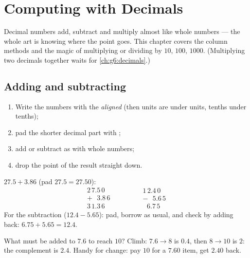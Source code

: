 \chapter{Computing with Decimals}\label{ch:g5:decimalops}

Decimal numbers add, subtract and multiply almost like whole numbers
--- the whole art is knowing where the point goes. This chapter
covers the column methods and the magic of multiplying or dividing by
$10$, $100$, $1000$. (Multiplying two decimals together waits for
\cref{ch:g6:decimals}.)

\section{Adding and subtracting}

\begin{method}\label{met:g5:decimalops:addsub}
\begin{enumerate}
  \item Write the numbers with the \emph{ aligned}
        (then units are under units, tenths under tenths);
  \item pad the shorter decimal part with ;
  \item add or subtract as with whole numbers;
  \item drop the point of the result straight down.
\end{enumerate}
\end{method}

\begin{example}\label{ex:g5:decimalops:addsub}
$27.5 + 3.86$ (pad $27.5 = 27.50$):
\[
\begin{array}{r}
2\,7.5\,0 \\
+\ \ \ 3.8\,6 \\
\hline
3\,1.3\,6
\end{array}
\qquad\qquad
\begin{array}{r}
1\,2.4\,0 \\
-\ \ \ 5.6\,5 \\
\hline
\ \ \,6.7\,5
\end{array}
\]
For the subtraction ($12.4 - 5.65$): pad, borrow as usual, and check
by adding back: $6.75 + 5.65 = 12.4$.
\end{example}

\begin{example}\label{ex:g5:decimalops:complement}
What must be added to $7.6$ to reach $10$? Climb: $7.6 \to 8$ is
$0.4$, then $8 \to 10$ is $2$: the complement is $2.4$. Handy for
change: pay $10$ for a $7.60$ item, get $2.40$ back.
\end{example}

